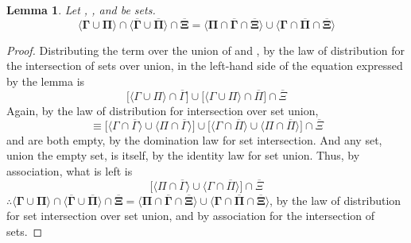 \documentclass[preview]{standalone}
\newtheorem{lemma}{Lemma}
\begin{document}
\begin{lemma} %
    Let \bm{$\Gamma$}, \bm{$\Pi$}, and \bm{$\Xi$} be sets.
    \begin{equation*}
    \bm{
        \Big \langle \Gamma \cup \Pi \Big \rangle
            \cap
        \Big \langle \overline{\Gamma} \cup \overline{\Pi} \Big \rangle
            \cap
        \overline{\Xi}
            =
        \Big \langle \Pi \cap \overline{\Gamma} \cap \overline{\Xi} \Big \rangle
            \cup
        \Big \langle \Gamma \cap \overline{\Pi} \cap \overline{\Xi} \Big \rangle
        }
    \end{equation*}
\end{lemma}
\begin{proof}
    Distributing the term \bm{$\Gamma \cup \Pi$} over the union of 
    \bm{$\overline{\Gamma}$} and \bm{$\overline{\Pi}$},
    by the law of distribution for the intersection of sets over union,
    in the left-hand side of the equation expressed by the lemma is
    \begin{equation*}
        \bigg[
            \Big \langle \Gamma \cup \Pi \Big \rangle
                \cap
            \overline{\Gamma}
        \bigg]
            \cup
        \bigg[
            \Big \langle \Gamma \cup \Pi \Big \rangle
                \cap
            \overline{\Pi}
        \bigg]
            \cap
        \overline{\Xi}
    \end{equation*}
    Again, by the law of distribution for intersection over set union,
    \begin{equation*}
        \equiv
        \bigg[
            \Big \langle \Gamma \cap \overline{\Gamma} \Big \rangle
                \cup
            \Big \langle \Pi \cap \overline{\Gamma} \Big \rangle
        \bigg]
            \cup
        \bigg[
            \Big \langle \Gamma \cap \overline{\Pi} \Big \rangle
                \cup
            \Big \langle \Pi \cap \overline{\Pi} \Big \rangle
        \bigg]
            \cap
        \overline{\Xi}
    \end{equation*}
    \bm{$\Gamma \cap \overline{\Gamma}$} and \bm{$\Pi \cap \overline{\Pi}$}
    are both empty, by the domination law for set intersection. And any set,
    union the empty set, is itself, by the identity law for set union. Thus,
    by association, what is left is
    \begin{equation*}       
        \bigg[
            \Big \langle \Pi \cap \overline{\Gamma} \Big \rangle
                \cup
            \Big \langle \Gamma \cap \overline{\Pi} \Big \rangle
        \bigg]
            \cap
        \overline{\Xi}
    \end{equation*}
    $\therefore \bm{
        \big \langle \Gamma \cup \Pi \big \rangle
            \cap
        \big \langle \overline{\Gamma} \cup \overline{\Pi} \big \rangle
            \cap
        \overline{\Xi}
            =
        \big \langle \Pi \cap \overline{\Gamma} \cap \overline{\Xi} \big \rangle
            \cup
        \big \langle \Gamma \cap \overline{\Pi} \cap \overline{\Xi} \big \rangle
    }$,
    by the law of distribution for set intersection over set union,
    and by association for the intersection of sets.
\end{proof}
\end{document}
